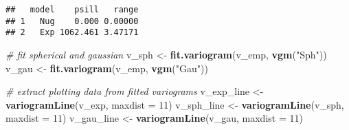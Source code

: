 \documentclass[]{book}
\newenvironment{Shaded}{\begin{snugshade}}{\end{snugshade}}
\newcommand{\CommentTok}[1]{\textcolor[rgb]{0.56,0.35,0.01}{\textit{#1}}}
\newcommand{\DataTypeTok}[1]{\textcolor[rgb]{0.13,0.29,0.53}{#1}}
\newcommand{\DecValTok}[1]{\textcolor[rgb]{0.00,0.00,0.81}{#1}}
\newcommand{\KeywordTok}[1]{\textcolor[rgb]{0.13,0.29,0.53}{\textbf{#1}}}
\newcommand{\NormalTok}[1]{#1}
\newcommand{\StringTok}[1]{\textcolor[rgb]{0.31,0.60,0.02}{#1}}
\begin{document}
\begin{verbatim}
##   model    psill   range
## 1   Nug    0.000 0.00000
## 2   Exp 1062.461 3.47171
\end{verbatim}

\begin{Shaded}
\begin{Highlighting}[]
\CommentTok{# fit spherical and gaussian}
\NormalTok{v_sph <-}\StringTok{ }\KeywordTok{fit.variogram}\NormalTok{(v_emp, }\KeywordTok{vgm}\NormalTok{(}\StringTok{"Sph"}\NormalTok{))}
\NormalTok{v_gau <-}\StringTok{ }\KeywordTok{fit.variogram}\NormalTok{(v_emp, }\KeywordTok{vgm}\NormalTok{(}\StringTok{"Gau"}\NormalTok{))}

\CommentTok{# extract plotting data from fitted variograms}
\NormalTok{v_exp_line <-}\StringTok{ }\KeywordTok{variogramLine}\NormalTok{(v_exp, }\DataTypeTok{maxdist =} \DecValTok{11}\NormalTok{)}
\NormalTok{v_sph_line <-}\StringTok{ }\KeywordTok{variogramLine}\NormalTok{(v_sph, }\DataTypeTok{maxdist =} \DecValTok{11}\NormalTok{)}
\NormalTok{v_gau_line <-}\StringTok{ }\KeywordTok{variogramLine}\NormalTok{(v_gau, }\DataTypeTok{maxdist =} \DecValTok{11}\NormalTok{)}


\end{Highlighting}
\end{Shaded}
\end{document}
